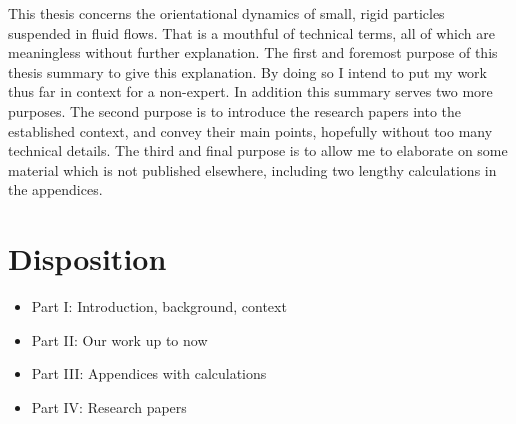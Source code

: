 \documentclass[thesis.tex]{subfiles}
\begin{document}
This thesis concerns the orientational dynamics of small, rigid particles suspended in fluid flows. That is a mouthful of technical terms, all of which are meaningless without further explanation. The first and foremost purpose of this thesis summary to give this explanation. By doing so I intend to put my work thus far in context for a non-expert. In addition this summary serves two more purposes. The second purpose is to introduce the research papers into the established context, and convey their main points, hopefully without too many technical details. The third and final purpose is to allow me to elaborate on some material which is not published elsewhere, including {\color{red}two} lengthy calculations in the appendices.

\section*{Disposition}

\begin{itemize}
	\item Part I: Introduction, background, context
	\item Part II: Our work up to now
	\item Part III: Appendices with calculations
	\item Part IV: Research papers
\end{itemize}
\end{document}
